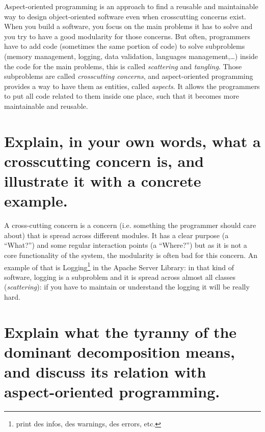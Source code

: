 \begin{solution}
{Aspect-oriented programming is an approach to find a reusable and maintainable
way to design object-oriented software even when crosscutting concerns exist.
When you build a software, you focus on the main problems it has to solve and
you try to have a good modularity for those concerns. But often, programmers
have to add code (sometimes the same portion of code) to solve subproblems (memory management, logging, data
validation, languages management,\ldots) inside the code for the main problems,
this is called \textit{scattering} and \textit{tangling}.
Those subproblems are called \textit{crosscutting concerns}, and aspect-oriented
programming provides a way to have them as entities, called \textit{aspects}.
It allows the programmers to put all code related to them inside one place,
such that it becomes more maintainable and reusable.
}

\end{solution}

\section{Explain, in your own words, what a crosscutting concern is, and illustrate it with a concrete example.}

\begin{solution}

A cross-cutting concern is a concern (i.e. something the programmer should care
about) that is spread across different modules. It has a clear purpose
(a \enquote{What?}) and some regular interaction points (a \enquote{Where?})
but as it is not a core functionality of the system, the modularity is often bad
for this concern. An example of that is Logging\footnote{print des infos, des
warnings, des errors, etc.} in the Apache Server Library: in that kind of
software, logging is a subproblem and it is spread across almost all classes
(\textit{scattering}): if you have to maintain or understand the logging it will
be really hard.

\end{solution}

\section{Explain what the tyranny of the dominant decomposition means, and discuss its relation
with aspect-oriented programming.}

